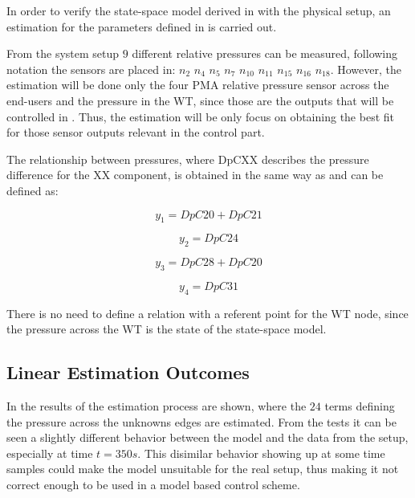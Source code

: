 In order to verify the state-space model derived in  with the physical setup, an estimation for the parameters defined in 
is carried out.

From the system setup $9$ different relative pressures can be measured, following  notation the sensors are placed in: 
$n_2$ $n_4$ $n_5$ $n_7$ $n_{10}$ $n_{11}$ $n_{15}$ $n_{16}$ $n_{18}$. However, the estimation will be done only the four PMA relative pressure 
sensor across the end-users and the pressure in the WT, since those are the outputs that will be controlled in . Thus, the estimation will be only focus on obtaining the best fit for those 
sensor outputs relevant in the control part. 

The relationship between pressures, where DpCXX describes the pressure difference for the XX component, is obtained in the same way as  and can be defined as:

\vspace{4mm}
\begin {equation}
     y_1 = DpC20 + DpC21  
\end{equation}

\vspace{4mm}
\begin {equation}
     y_2 = DpC24
\end{equation}


\vspace{4mm}
\begin {equation}
     y_3 = DpC28 + DpC20 
\end{equation}

\vspace{4mm}
\begin {equation}
     y_4 = DpC31 
\end{equation}

There is no need to define a relation with a referent point for the WT node, since the pressure across the WT is the state of the state-space model. 

\subsection{Linear Estimation Outcomes}
In  the results of the estimation process are shown, where the $24$ terms defining the pressure across the unknowns edges are estimated.
From the tests it can be seen a slightly different behavior between the model and the data from the setup, especially at time $t = 350s$. This disimilar 
behavior showing up at some time samples could make the model unsuitable for the real setup, thus making it not correct enough to be used in a model based control scheme. 

